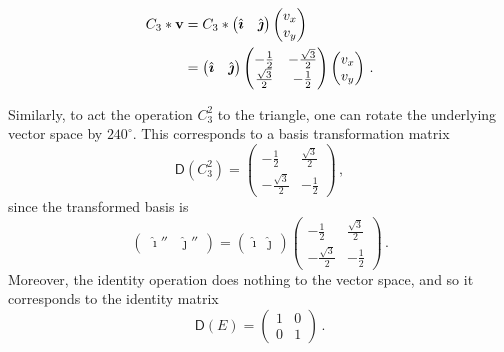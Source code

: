 \documentclass{article}
\theoremstyle{plain}\theoremheaderfont{\normalfont\itshape}\theorembodyfont{\rmfamily}\theoremseparator{.}\newtheorem*{rem}{Remark}\newtheorem*{ex}{Example}\newtheorem*{proof}{Proof}\newtheorem*{altp}{Alternative proof}
\theoremstyle{plain}\theoremheaderfont{\normalfont\bfseries}\theorembodyfont{\rmfamily}\theoremseparator{.}\newtheorem{thm}{Theorem}[section]\newtheorem{lem}[thm]{Lemma}\newtheorem{prop}[thm]{Proposition}\newtheorem*{cor}{Corollary}\newtheorem{defn}[thm]{Definition}\newtheorem{clm}[thm]{Claim}\newtheorem{clminproof}{Claim}\newtheorem*{law}{Law}\newtheorem{pos}[thm]{Postulate}
\theoremstyle{break}\theoremheaderfont{\normalfont\itshape}\theorembodyfont{\rmfamily}\theoremseparator{.\medskip}\newtheorem*{proofskip}{Proof}\newtheorem*{exs}{Examples}\newtheorem*{rems}{Remarks}
\theoremstyle{break}\theoremheaderfont{\normalfont\bfseries}\theorembodyfont{\rmfamily}\theoremseparator{.\medskip}\newtheorem{lemskip}[thm]{Lemma}\newtheorem{defnskip}[thm]{Definition}\newtheorem{propskip}[thm]{Proposition}\newtheorem{thmskip}[thm]{Theorem}
\numberwithin{equation}{section}
\newcommand{\vb}[1]{\bm{\mathrm{#1}}}
\newcommand{\vu}[1]{\hat{\bm{\mathrm{#1}}}}
\newcommand{\DD}{\mathsf{D}}
\begin{document}
    \begin{align}
        C_3*\vb{v}&=C_3*\begin{pmatrix}
            \vu{\imath} & \vu{\jmath}
        \end{pmatrix}\begin{pmatrix}
            v_x \\ v_y
        \end{pmatrix}\notag \\
        &=\begin{pmatrix}
            \vu{\imath} & \vu{\jmath}
        \end{pmatrix}\begin{pmatrix}
            -\frac{1}{2} & -\frac{\sqrt{3}}{2} \\
            \frac{\sqrt{3}}{2} & -\frac{1}{2}
        \end{pmatrix}\begin{pmatrix}
            v_x \\ v_y
        \end{pmatrix}\,.
    \end{align}

    Similarly, to act the operation \(C_3^2\) to the triangle, one can rotate the underlying vector space by \(240^\circ\). This corresponds to a basis transformation matrix
    \begin{equation}
        \DD(C_3^2)=\begin{pmatrix}
            -\frac{1}{2} & \frac{\sqrt{3}}{2} \\
            -\frac{\sqrt{3}}{2} & -\frac{1}{2}
        \end{pmatrix}\,,
    \end{equation}
    since the transformed basis is
    \begin{equation}
        \begin{pmatrix}
            \vu{\imath}'' & \vu{\jmath}''
        \end{pmatrix}=\begin{pmatrix}
            \vu{\imath} & \vu{\jmath}
        \end{pmatrix}\begin{pmatrix}
            -\frac{1}{2} & \frac{\sqrt{3}}{2} \\
            -\frac{\sqrt{3}}{2} & -\frac{1}{2}
        \end{pmatrix}\,.
    \end{equation}
    Moreover, the identity operation does nothing to the vector space, and so it corresponds to the identity matrix
    \begin{equation}
        \DD(E)=\begin{pmatrix}
            1 & 0 \\
            0 & 1
        \end{pmatrix}\,.
    \end{equation}
\end{document}
